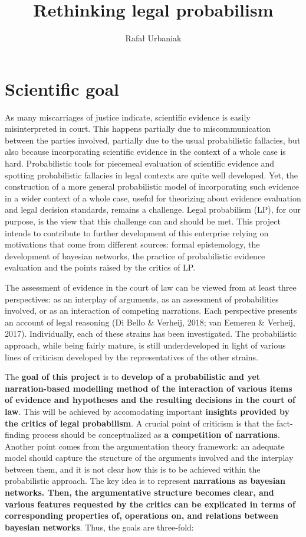 \documentclass[11pt,dvipsnames,enabledeprecatedfontcommands]{scrartcl}
\title{Rethinking legal probabilism}
\author{Rafał Urbaniak}
\date{}
\begin{document}
\maketitle

\thispagestyle{empty}

\section{Scientific goal}\label{scientific-goal}

As many miscarriages of justice indicate, scientific evidence is easily
misinterpreted in court. This happens partially due to miscommunication
between the parties involved, partially due to the usual probabilistic
fallacies, but also because incorporating scientific evidence in the
context of a whole case is hard. Probabilistic tools for piecemeal
evaluation of scientific evidence and spotting probabilistic fallacies
in legal contexts are quite well developed. Yet, the construction of a
more general probabilistic model of incorporating such evidence in a
wider context of a whole case, useful for theorizing about evidence
evaluation and legal decision standards, remains a challenge. Legal
probabilism (LP), for our purpose, is the view that this challenge can
and should be met. This project intends to contribute to further
development of this enterprise relying on motivations that come from
different sources: formal epistemology, the development of bayesian
networks, the practice of probabilistic evidence evaluation and the
points raised by the critics of LP.

The assessment of evidence in the court of law can be viewed from at
least three perspectives: as an interplay of arguments, as an assessment
of probabilities involved, or as an interaction of competing narrations.
Each perspective presents an account of legal reasoning (Di Bello \&
Verheij, 2018; van Eemeren \& Verheij, 2017). Individually, each of
these strains has been investigated. The probabilistic approach, while
being fairly mature, is still underdeveloped in light of various lines
of criticism developed by the representatives of the other strains.

The \textbf{goal of this project} is to
\textbf{develop of a probabilistic and yet narration-based  modelling method of the  interaction of various items of evidence and hypotheses and the resulting decisions in the court of law}.
This will be achieved by accomodating important
\textbf{insights provided by the critics of legal probabilism}. A
crucial point of criticism is that the fact-finding process should be
conceptualized as \textbf{a competition of narrations}. Another point
comes from the argumentation theory framework: an adequate model should
capture the structure of the arguments involved and the interplay
between them, and it is not clear how this is to be achieved within the
probabilistic approach. The key idea is to represent
\textbf{narrations  as bayesian networks. Then, the argumentative structure becomes clear,  and various features requested by the critics can be explicated in terms of corresponding properties of,  operations on, and relations between bayesian networks}.
Thus, the goals are three-fold:
\end{document}
